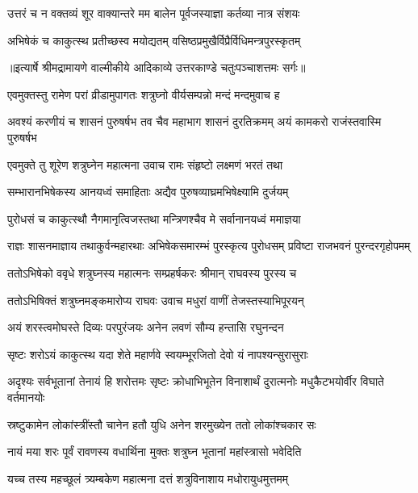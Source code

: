 \twolineshloka
{उत्तरं च न वक्तव्यं शूर वाक्यान्तरे मम}
{बालेन पूर्वजस्याज्ञा कर्तव्या नात्र संशयः} %

\twolineshloka
{अभिषेकं च काकुत्स्थ प्रतीच्छस्व मयोद्यतम्}
{वसिष्ठप्रमुखैर्विप्रैर्विधिमन्त्रपुरस्कृतम्} %


{॥इत्यार्षे श्रीमद्रामायणे वाल्मीकीये आदिकाव्ये उत्तरकाण्डे चतुःपञ्चाशत्तमः सर्गः॥}


\twolineshloka
{एवमुक्तस्तु रामेण परां व्रीडामुपागतः}
{शत्रुघ्नो वीर्यसम्पन्नो मन्दं मन्दमुवाच ह} %

\threelineshloka
{अवश्यं करणीयं च शासनं पुरुषर्षभ}
{तव चैव महाभाग शासनं दुरतिक्रमम्}
{अयं कामकरो राजंस्तवास्मि पुरुषर्षभ} %

\twolineshloka
{एवमुक्ते तु शूरेण शत्रुघ्नेन महात्मना}
{उवाच रामः संहृष्टो लक्ष्मणं भरतं तथा} %

\twolineshloka
{सम्भारानभिषेकस्य आनयध्वं समाहिताः}
{अद्यैव पुरुषव्याघ्रमभिषेक्ष्यामि दुर्जयम्} %

\twolineshloka
{पुरोधसं च काकुत्स्थौ नैगमानृत्विजस्तथा}
{मन्त्रिणश्चैव मे सर्वानानयध्वं ममाज्ञया} %

\threelineshloka
{राज्ञः शासनमाज्ञाय तथाकुर्वन्महारथाः}
{अभिषेकसमारम्भं पुरस्कृत्य पुरोधसम्}
{प्रविष्टा राजभवनं पुरन्दरगृहोपमम्} %

\twolineshloka
{ततोऽभिषेको ववृधे शत्रुघ्नस्य महात्मनः}
{सम्प्रहर्षकरः श्रीमान् राघवस्य पुरस्य च} %

\twolineshloka
{ततोऽभिषिक्तं शत्रुघ्नमङ्कमारोप्य राघवः}
{उवाच मधुरां वाणीं तेजस्तस्याभिपूरयन्} %

\twolineshloka
{अयं शरस्त्वमोघस्ते दिव्यः परपुरंजयः}
{अनेन लवणं सौम्य हन्तासि रघुनन्दन} %

\twolineshloka
{सृष्टः शरोऽयं काकुत्स्थ यदा शेते महार्णवे}
{स्वयम्भूरजितो देवो यं नापश्यन्सुरासुराः} %

\threelineshloka
{अदृश्यः सर्वभूतानां तेनायं हि शरोत्तमः}
{सृष्टः क्रोधाभिभूतेन विनाशार्थं दुरात्मनोः}
{मधुकैटभयोर्वीर विघाते वर्तमानयोः} %

\twolineshloka
{स्रष्टुकामेन लोकांस्त्रींस्तौ चानेन हतौ युधि}
{अनेन शरमुख्येन ततो लोकांश्चकार सः} %

\twolineshloka
{नायं मया शरः पूर्वं रावणस्य वधार्थिना}
{मुक्तः शत्रुघ्न भूतानां महांस्त्रासो भवेदिति} %

\twolineshloka
{यच्च तस्य महच्छूलं त्र्यम्बकेण महात्मना}
{दत्तं शत्रुविनाशाय मधोरायुधमुत्तमम्} %

